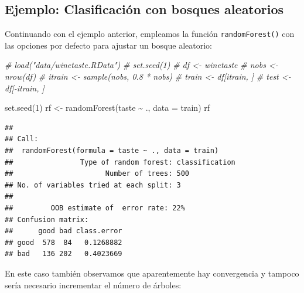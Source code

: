 \documentclass[
  spanish,
]{book}
\newenvironment{Shaded}{\begin{snugshade}}{\end{snugshade}}
\newcommand{\AttributeTok}[1]{\textcolor[rgb]{0.77,0.63,0.00}{#1}}
\newcommand{\CommentTok}[1]{\textcolor[rgb]{0.56,0.35,0.01}{\textit{#1}}}
\newcommand{\DecValTok}[1]{\textcolor[rgb]{0.00,0.00,0.81}{#1}}
\newcommand{\FunctionTok}[1]{\textcolor[rgb]{0.00,0.00,0.00}{#1}}
\newcommand{\NormalTok}[1]{#1}
\newcommand{\OtherTok}[1]{\textcolor[rgb]{0.56,0.35,0.01}{#1}}
\newcommand{\SpecialCharTok}[1]{\textcolor[rgb]{0.00,0.00,0.00}{#1}}
\newcommand{\StringTok}[1]{\textcolor[rgb]{0.31,0.60,0.02}{#1}}
\theoremstyle{break}
\theoremstyle{definition}
\theoremstyle{definition}
\theoremstyle{definition}
\theoremstyle{definition}
\theoremstyle{remark}
\begin{document}
\hypertarget{ejemplo-clasif-rf}{%
\subsection{Ejemplo: Clasificación con bosques aleatorios}\label{ejemplo-clasif-rf}}

Continuando con el ejemplo anterior, empleamos la función \texttt{randomForest()} con las opciones por defecto para ajustar un bosque aleatorio:

\begin{Shaded}
\begin{Highlighting}[]
\CommentTok{\# load("data/winetaste.RData")}
\CommentTok{\# set.seed(1)}
\CommentTok{\# df \textless{}{-} winetaste}
\CommentTok{\# nobs \textless{}{-} nrow(df)}
\CommentTok{\# itrain \textless{}{-} sample(nobs, 0.8 * nobs)}
\CommentTok{\# train \textless{}{-} df[itrain, ]}
\CommentTok{\# test \textless{}{-} df[{-}itrain, ]}

\FunctionTok{set.seed}\NormalTok{(}\DecValTok{1}\NormalTok{)}
\NormalTok{rf }\OtherTok{\textless{}{-}} \FunctionTok{randomForest}\NormalTok{(taste }\SpecialCharTok{\textasciitilde{}}\NormalTok{ ., }\AttributeTok{data =}\NormalTok{ train)}
\NormalTok{rf}
\end{Highlighting}
\end{Shaded}

\begin{verbatim}
## 
## Call:
##  randomForest(formula = taste ~ ., data = train) 
##                Type of random forest: classification
##                      Number of trees: 500
## No. of variables tried at each split: 3
## 
##         OOB estimate of  error rate: 22%
## Confusion matrix:
##      good bad class.error
## good  578  84   0.1268882
## bad   136 202   0.4023669
\end{verbatim}

En este caso también observamos que aparentemente hay convergencia y tampoco sería necesario incrementar el número de árboles:

\begin{Shaded}
\end{Shaded}
\end{document}
